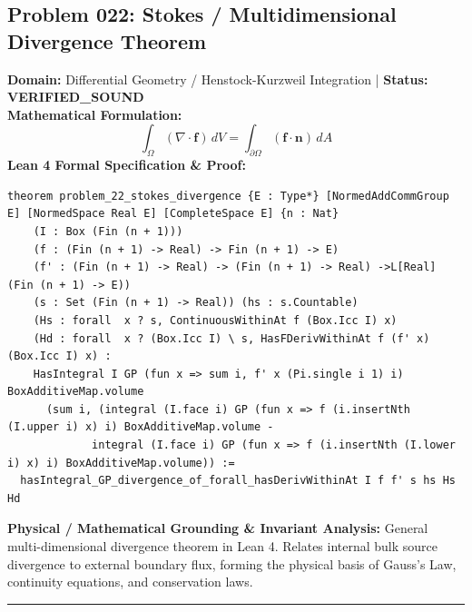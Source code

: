 \documentclass[10pt,a4paper]{article}
\begin{document}
\subsection*{Problem 022: Stokes / Multidimensional Divergence Theorem}
\textbf{Domain:} Differential Geometry / Henstock-Kurzweil Integration \quad | \quad \textbf{Status:} \textcolor{green!70!black}{\textbf{VERIFIED\_SOUND}}\\
\textbf{Mathematical Formulation:}
\begin{equation*}
  \int_{\Omega} (\nabla \cdot \mathbf{f})\, dV = \int_{\partial \Omega} (\mathbf{f} \cdot \mathbf{n})\, dA
\end{equation*}
\textbf{Lean 4 Formal Specification \& Proof:}
\begin{lstlisting}
theorem problem_22_stokes_divergence {E : Type*} [NormedAddCommGroup E] [NormedSpace Real E] [CompleteSpace E] {n : Nat} 
    (I : Box (Fin (n + 1)))
    (f : (Fin (n + 1) -> Real) -> Fin (n + 1) -> E)
    (f' : (Fin (n + 1) -> Real) -> (Fin (n + 1) -> Real) ->L[Real] (Fin (n + 1) -> E))
    (s : Set (Fin (n + 1) -> Real)) (hs : s.Countable)
    (Hs : forall  x ? s, ContinuousWithinAt f (Box.Icc I) x)
    (Hd : forall  x ? (Box.Icc I) \ s, HasFDerivWithinAt f (f' x) (Box.Icc I) x) :
    HasIntegral I GP (fun x => sum i, f' x (Pi.single i 1) i) BoxAdditiveMap.volume
      (sum i, (integral (I.face i) GP (fun x => f (i.insertNth (I.upper i) x) i) BoxAdditiveMap.volume -
             integral (I.face i) GP (fun x => f (i.insertNth (I.lower i) x) i) BoxAdditiveMap.volume)) :=
  hasIntegral_GP_divergence_of_forall_hasDerivWithinAt I f f' s hs Hs Hd
\end{lstlisting}
\textbf{Physical / Mathematical Grounding \& Invariant Analysis:}
General multi-dimensional divergence theorem in Lean 4. Relates internal bulk source divergence to external boundary flux, forming the physical basis of Gauss's Law, continuity equations, and conservation laws.
\vspace{0.8em}\hrule\vspace{0.8em}
\end{document}
